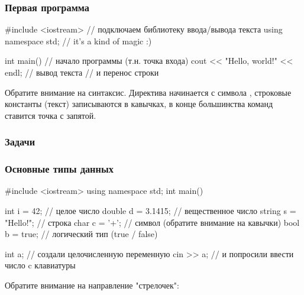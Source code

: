 


\begin{frame}[fragile]
	\frametitle{Первая программа}
	\begin{code}
#include <iostream> // подключаем библиотеку ввода/вывода текста
using namespace std; // it's a kind of magic :)

int main() // начало программы (т.н. точка входа)
{
	cout << "Hello, world!" << endl; // вывод текста
                                     // и перенос строки
}
	\end{code}
	Обратите внимание на синтаксис. Директива  начинается с
	символа \lcode{#}, строковые константы (текст) записываются в кавычках, в
	конце большинства команд ставится точка с запятой.
\end{frame}

\begin{frame}
	\frametitle{Задачи}
\end{frame}

\begin{frame}[fragile]
	\frametitle{Основные типы данных}
	\begin{code}
#include <iostream>
using namespace std;
int main()
{
	int i = 42; // целое число
	double d = 3.1415; // вещественное число
	string s = "Hello!"; // строка
	char c = '+'; // символ (обратите внимание на кавычки)
	bool b = true; // логический тип (true / false)

	int a; // создали целочисленную переменную
	cin >> a; // и попросили ввести число c клавиатуры
}
	\end{code}
	Обратите внимание на направление "стрелочек": \\
\end{frame}

